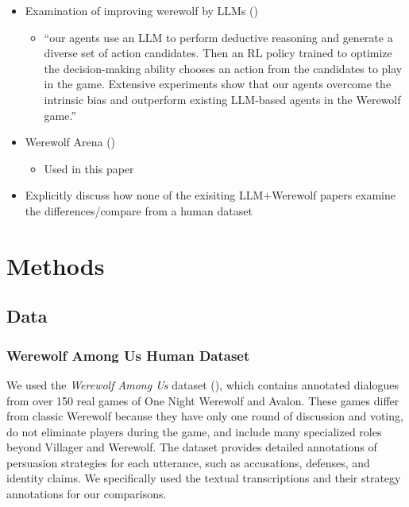 \documentclass[
  letterpaper,
  DIV=11,
  numbers=noendperiod]{scrreprt}
\providecommand{\tightlist}{%
  \setlength{\itemsep}{0pt}\setlength{\parskip}{0pt}}
\begin{document}
\begin{itemize}
\tightlist
\item
  Examination of improving werewolf by LLMs
  ()

  \begin{itemize}
  \tightlist
  \item
    ``our agents use an LLM to perform deductive reasoning and generate
    a diverse set of action candidates. Then an RL policy trained to
    optimize the decision-making ability chooses an action from the
    candidates to play in the game. Extensive experiments show that our
    agents overcome the intrinsic bias and outperform existing LLM-based
    agents in the Werewolf game.''
  \end{itemize}
\item
  Werewolf Arena ()

  \begin{itemize}
  \tightlist
  \item
    Used in this paper
  \end{itemize}
\item
  Explicitly discuss how none of the exisiting LLM+Werewolf papers
  examine the differences/compare from a human dataset
\end{itemize}

\chapter{Methods}\label{methods}

\section{Data}\label{data}

\subsection{Werewolf Among Us Human
Dataset}\label{werewolf-among-us-human-dataset}

We used the \emph{Werewolf Among Us} dataset
(), which
contains annotated dialogues from over 150 real games of One Night
Werewolf and Avalon. These games differ from classic Werewolf because
they have only one round of discussion and voting, do not eliminate
players during the game, and include many specialized roles beyond
Villager and Werewolf. The dataset provides detailed annotations of
persuasion strategies for each utterance, such as accusations, defenses,
and identity claims. We specifically used the textual transcriptions and
their strategy annotations for our comparisons.
\end{document}

